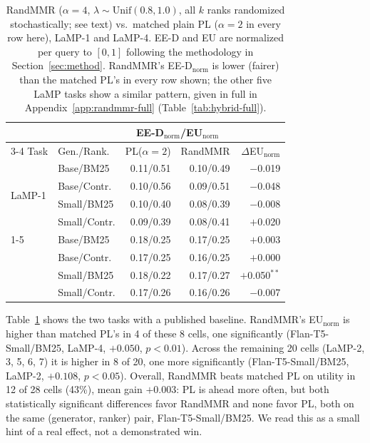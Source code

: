 \documentclass[10pt,twocolumn]{article}
\begin{document}
\begin{table}[t]
\centering
\scriptsize
\setlength{\tabcolsep}{3pt}
\caption{RandMMR ($\alpha{=}4$, $\lambda\sim\mathrm{Unif}(0.8,1.0)$, all $k$
ranks randomized stochastically; see text) vs.\ matched plain PL
($\alpha{=}2$ in every row here), LaMP-1 and LaMP-4. EE-D and
EU are normalized per query to $[0,1]$ following the methodology in
Section~\ref{sec:method}. RandMMR's EE-D$_{\text{norm}}$ is lower (fairer) than
the matched PL's in every row shown; the other five LaMP tasks show a similar
pattern, given in full in Appendix~\ref{app:randmmr-full}
(Table~\ref{tab:hybrid-full}).}
\label{tab:hybrid}
\begin{tabular}{@{}ll rr r@{}}
\toprule
& & \multicolumn{2}{c}{EE-D$_{\text{norm}}$/EU$_{\text{norm}}$} & \\
\cmidrule(lr){3-4}
Task & Gen./Rank. & PL($\alpha{=}2$) & RandMMR & $\Delta$EU$_{\text{norm}}$ \\
\midrule
\multirow{4}{*}{LaMP-1} & Base/BM25    & 0.11/0.51 & 0.10/0.49 & $-$0.019 \\
 & Base/Contr.  & 0.10/0.56 & 0.09/0.51 & $-$0.048 \\
 & Small/BM25   & 0.10/0.40 & 0.08/0.39 & $-$0.008 \\
 & Small/Contr. & 0.09/0.39 & 0.08/0.41 & $+$0.020 \\
\cmidrule(lr){1-5}
\multirow{4}{*}{LaMP-4} & Base/BM25    & 0.18/0.25 & 0.17/0.25 & $+$0.003 \\
 & Base/Contr.  & 0.17/0.25 & 0.16/0.25 & $+$0.000 \\
 & Small/BM25   & 0.18/0.22 & 0.17/0.27 & $+$0.050$^{**}$ \\
 & Small/Contr. & 0.17/0.26 & 0.16/0.26 & $-$0.007 \\
\bottomrule
\end{tabular}
\end{table}

Table~\ref{tab:hybrid} shows the two tasks with a published baseline. RandMMR's
EU$_{\text{norm}}$ is higher than matched PL's in 4 of these 8 cells, one
significantly (Flan-T5-Small/BM25, LaMP-4, $+0.050$, $p{<}0.01$). Across the
remaining 20 cells (LaMP-2, 3, 5, 6, 7) it is higher in 8 of 20, one more
significantly (Flan-T5-Small/BM25, LaMP-2, $+0.108$, $p{<}0.05$). Overall,
RandMMR beats matched PL on utility in 12 of 28 cells (43\%), mean gain
$+0.003$: PL is ahead more often, but both statistically significant differences
favor RandMMR and none favor PL, both on the same (generator, ranker) pair,
Flan-T5-Small/BM25. We read this as a small hint of a real effect, not a
demonstrated win.
\end{document}
